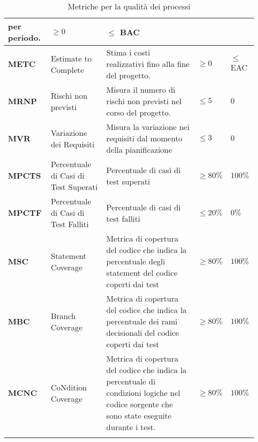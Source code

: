 \begin{longtable}{|C{1.5cm}|L{3cm}|L{4cm}|L{2.5cm}|L{2.5cm}|}
        per periodo. & $\geq 0  $ & $ \leq$ BAC  \\
        \hline
        \textbf{METC} & Estimate to Complete &  Stima i costi realizzativi fino alla fine del progetto. & $\geq 0  $ & $ \leq$ EAC  \\
        \hline
        \textbf{MRNP}    & Rischi non previsti   & Misura il numero di rischi non previsti nel corso del progetto. & $\leq 5$ &   $0$ \\
        \hline
        \textbf{MVR} & Variazione dei Requisiti & Misura la variazione nei requisiti dal momento della pianificazione & $\leq 3$ & $0$ \\
        \hline
        \textbf{MPCTS} & Percentuale di Casi di Test Superati & Percentuale di casi di test superati & $\geq 80\%$ & $100\%$ \\
        \hline
        \textbf{MPCTF} & Percentuale di Casi di Test Falliti & Percentuale di casi di test falliti & $\leq 20\%$ & $0\%$ \\
        \hline
        \textbf{MSC} & Statement Coverage & Metrica di copertura del codice che indica la percentuale degli statement del codice coperti dai test & $\geq 80\%$ & $100\%$ \\
        \hline
        \textbf{MBC} & Branch Coverage & Metrica di copertura del codice che indica la percentuale dei rami decisionali del codice coperti dai test & $\geq 80\%$ & $100\%$ \\
        \hline
        \textbf{MCNC} & CoNdition Coverage & Metrica di copertura del codice che indica la percentuale di condizioni logiche nel codice sorgente che sono state eseguite durante i test. & $\geq 80\%$ & $100\%$ \\
        \hline
        \caption{Metriche per la qualità dei processi}
        \label{tab:qualità_processo_progetto}
        \end{longtable}